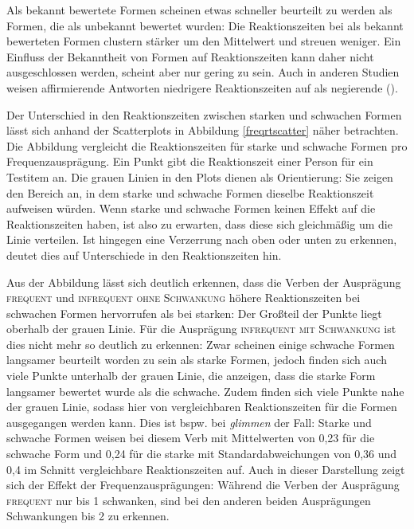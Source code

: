Als bekannt bewertete Formen scheinen etwas schneller beurteilt zu werden als Formen, die als unbekannt bewertet wurden: Die Reaktionszeiten bei als bekannt bewerteten Formen clustern stärker um den Mittelwert und streuen weniger. Ein Einfluss der Bekanntheit von Formen auf Reaktionszeiten kann daher nicht ausgeschlossen werden, scheint aber nur gering zu sein. Auch in anderen Studien weisen affirmierende Antworten niedrigere Reaktionszeiten auf als negierende (\cite[282--283]{Wegge.2001}). 

Der Unterschied in den Reaktionszeiten zwischen starken und schwachen Formen lässt sich anhand der Scatterplots in Abbildung \ref{freqrtscatter} näher betrachten. Die Abbildung vergleicht die Reaktionszeiten für starke und schwache Formen pro Frequenzausprägung. Ein Punkt gibt die Reaktionszeit einer Person für ein Test\-item an. Die grauen Linien in den Plots dienen als Orientierung: Sie zeigen den Bereich an, in dem starke und schwache Formen dieselbe Reaktionszeit aufweisen würden. Wenn starke und schwache Formen keinen Effekt auf die Reaktionszeiten haben, ist also zu erwarten, dass diese sich gleichmäßig um die Linie verteilen. Ist hingegen eine Verzerrung nach oben oder unten zu erkennen, deutet dies auf Unterschiede in den Reaktionszeiten hin.\clearpage

Aus der Abbildung lässt sich deutlich erkennen, dass die Verben der Ausprägung \textsc{frequent} und \textsc{infrequent ohne Schwankung} höhere Reaktionszeiten bei schwachen Formen hervorrufen als bei starken: Der Großteil der Punkte liegt oberhalb der grauen Linie. Für die Ausprägung \textsc{infrequent mit Schwankung} ist dies nicht mehr so deutlich zu erkennen: Zwar scheinen einige schwache Formen langsamer beurteilt worden zu sein als starke Formen, jedoch finden sich auch viele Punkte unterhalb der grauen Linie, die anzeigen, dass die starke Form langsamer bewertet wurde als die schwache. Zudem finden sich viele Punkte nahe der grauen Linie, sodass hier von vergleichbaren Reaktionszeiten für die Formen ausgegangen werden kann. Dies ist bspw. bei \textit{glimmen} der Fall: Starke und schwache Formen weisen bei diesem Verb mit Mittelwerten von 0,23 für die schwache Form und 0,24 für die starke mit Standardabweichungen von 0,36 und 0,4 im Schnitt vergleichbare Reaktionszeiten auf. Auch in dieser Darstellung zeigt sich der Effekt der Frequenzausprägungen: Während die Verben der Ausprägung \textsc{frequent} nur bis 1 schwanken, sind bei den anderen beiden Ausprägungen Schwankungen bis 2 zu erkennen. 

